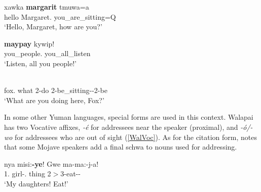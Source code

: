 \begin{exe}\ex\label{DieVoc}
\begin{xlist}
\ex\gll xawka \textbf{margarit} t\textschwa muwa=a\\
hello Margaret.\acc{} you\_are\_sitting=Q\\
\glt `Hello, Margaret, how are you?'

\ex\gll \textbf{may\textglotstop pay} k\textschwa y\textschwa wip!\\
you\_people.\acc{} you\_all\_listen\\
\glt `Listen, all you people!'
\end{xlist}
\end{exe}

\begin{exe}\ex\label{JamVoc}
\gll\textbf{}    \\
fox.\acc{} what 2-do 2-be\_sitting-\ssbj{}-2-be\\
\glt `What are you doing here, Fox?' 
\end{exe}

In some other Yuman languages, special forms are used in this context.
Walapai has two Vocative affixes, \emph{-\'e} for addressees near the speaker (proximal), and \emph{-\'o/-wo} for addressees who are out of sight (\ref{WalVoc}).
As for the citation form, \citet[129, footnote 3]{Munro:1976} notes that some Mojave speakers add a final schwa to nouns used for addressing.  %

\begin{exe}\ex\label{WalVoc}
\gll nya misi:\textbf{-ye}! Gwe ma-ma:-j-a!\\
1\sg{}.\poss{} girl-\pl{}.\voc{} thing 2$>$3-eat-\pl{}-\imp{}\\
\glt `My daughters! Eat!' %
\end{exe}

